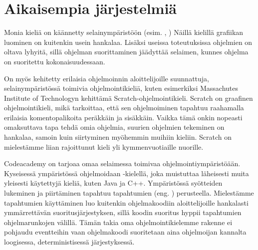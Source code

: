 
\section{Aikaisempia järjestelmiä}
Monia kieliä on käännetty selainympäristöön
(esim. , ) \cite{repl.it}
Näillä kielillä grafiikan luominen on kuitenkin usein hankalaa.
Lisäksi useissa toteutuksissa ohjelmien on oltava lyhyitä,
sillä ohjelman suorittaminen jäädyttää selaimen,
kunnes ohjelma on suoritettu kokonaisuudessaan.

On myös kehitetty erilaisia ohjelmoinnin aloittelijoille suunnattuja,
selainympäristössä toimivia ohjelmointikieliä,
kuten esimerkiksi Massachutes Institute of Technologyn
kehittämä Scratch-ohjelmointikieli.
Scratch on graafinen ohjelmointikieli,
mikä tarkoittaa,
että sen ohjelmoiminen tapahtuu raahamalla erilaisia komentopalikoita
peräkkäin ja sisäkkäin.
Vaikka tämä onkin nopeasti omaksuttava tapa tehdä omia ohjelmia,
suurien ohjelmien tekeminen on hankalaa,
samoin kuin siirtyminen myöhemmin muihiin kieliin.
Scratch on mielestämme liian rajoittunut kieli
yli kymmenvuotiaille nuorille.

Codeacademy on tarjoaa omaa selaimessa toimivaa ohjelmointiympäristöään.
Kyseisessä ympäristössä ohjelmoidaan -kielellä,
joka muistuttaa läheisesti muita yleisesti käytettyjä kieliä,
kuten Java ja C++.
Ympäristössä syötteiden lukeminen ja piirtäminen
tapahtuu tapahtumien (eng. ) perusteella.
Mielestämme tapahtumien käyttäminen luo kuitenkin ohjelmakoodiin
aloittelijoille hankalasti ymmärrettävän suoritusjärjestyksen,
sillä koodin suoritus hyppii tapahtumien ohjelmarunkojen välillä.
Tämän takia oma ohjelmointikielemme rakenne ei pohjaudu eventteihin
vaan ohjelmakoodi suoritetaan aina ohjelmoijan kannalta loogisessa,
deterministisessä järjestyksessä.

